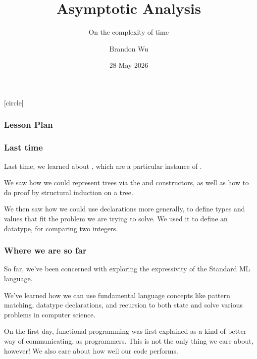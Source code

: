 \documentclass[aspectratio=169]{beamer}
\title{Asymptotic Analysis} %
\subtitle{On the complexity of time} %
\date{28 May 2026} %
\author{Brandon Wu} %
\newif\ifcolorlambda
\begin{document}
\ifweb
    \renewcommand{\pause}{}
\fi

[circle]

{
\begin{frame}[plain]
    \colorlambdatrue
    \titlepage
\end{frame}
}

\begin{frame}[fragile]
  \frametitle{Lesson Plan}

  \tableofcontents
\end{frame}

\begin{frame}[fragile]
  \frametitle{Last time}

  Last time, we learned about , which are a particular instance of
  .

  \vspace{\fill}

  We saw how we could represent trees via the  and 
  constructors, as well as how to do proof by structural induction on a tree.

  \vspace{\fill}

  We then saw how we could use  declarations more generally, to
  define types and values that fit the problem we are trying to solve. We used
  it to define an  datatype, for comparing two integers.
\end{frame}


\begin{frame}[fragile]
  \frametitle{Where we are so far}

  So far, we've been concerned with exploring the expressivity of the Standard ML
  language.

  \pause
  \vspace{\fill}

  We've learned how we can use fundamental language concepts like
  pattern matching, datatype declarations, and recursion
  to both state and solve various problems in computer science.

  \pause
  \vspace{\fill}

  On the first day, functional programming was first explained as a kind of
  better way of communicating, as programmers. This is not the only thing we
  care about, however! We also care about how well our code performs.
\end{frame}
\end{document}
